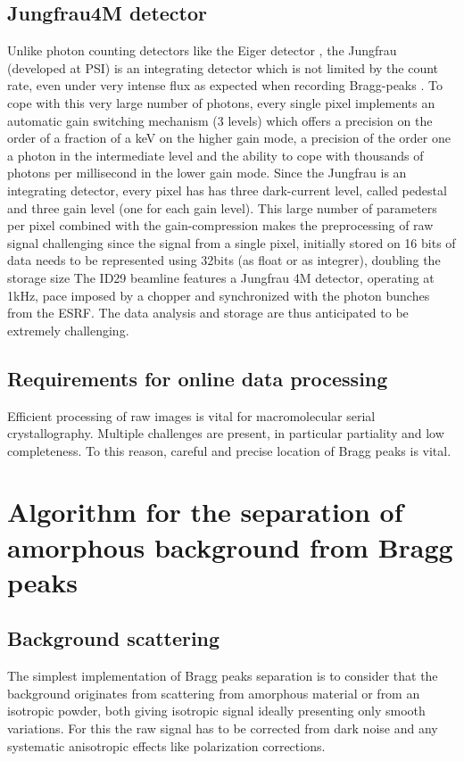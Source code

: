 \documentclass[preprint]{iucr}              %
\begin{document}
\subsection{Jungfrau4M detector}
Unlike photon counting detectors like the Eiger detector \cite{Eiger}, the Jungfrau (developed at PSI) is an integrating detector which is not limited by the count rate, even under very intense flux as expected when recording Bragg-peaks \cite{jungfrau2016}.
To cope with this very large number of photons, every single pixel implements an automatic gain switching mechanism (3 levels) which offers a precision on the order of a fraction of a keV on the higher gain mode, a precision of the order one a photon in the intermediate level and the ability to cope with thousands of photons  per millisecond in the lower gain mode.
Since the Jungfrau is an integrating detector, every pixel has has three dark-current level, called pedestal and three gain level (one for each gain level). 
This large number of parameters per pixel combined with the gain-compression makes the preprocessing of raw signal challenging since the signal from a single pixel, initially stored on 16 bits of data needs to be represented using 32bits (as float or as integrer), doubling the storage size\cite{jungfrau_PSI}
The ID29 beamline features a Jungfrau 4M detector, operating at 1kHz, pace imposed by a chopper and synchronized with the photon bunches from the ESRF.
The data analysis and storage are thus anticipated to be extremely challenging. 
\subsection{Requirements for online data processing}
Efficient processing of raw images is vital for macromolecular serial crystallography.
Multiple challenges are present, in particular partiality and low completeness.
To this reason, careful and precise location of Bragg peaks is vital.

\section{Algorithm for the separation of amorphous background from Bragg peaks}
\subsection{Background scattering}

The simplest implementation of Bragg peaks separation is to consider that the background originates from scattering from amorphous material or from an isotropic powder, both giving isotropic signal ideally presenting only smooth variations.
For this the raw signal has to be corrected from dark noise and any systematic anisotropic effects like polarization corrections.
\end{document}
